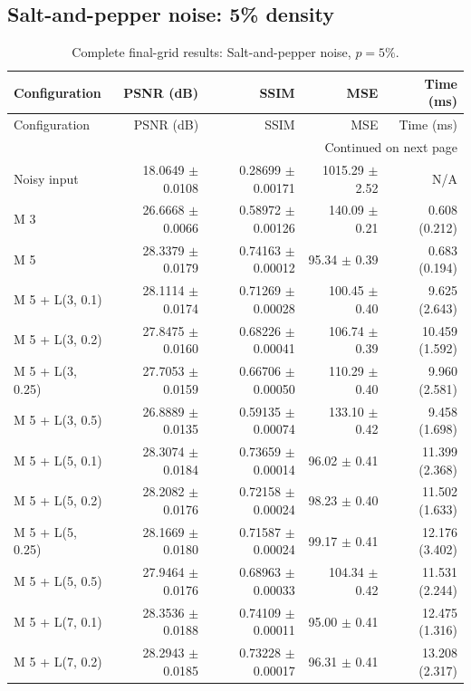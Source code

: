 \subsection{Salt-and-pepper noise: 5\% density}
\begingroup
\footnotesize
\setlength{\tabcolsep}{4pt}
\begin{longtable}{lrrrr}
\caption{Complete final-grid results: Salt-and-pepper noise, $p=5\%$.}\\
\toprule Configuration & PSNR (dB) & SSIM & MSE & Time (ms) \\ \midrule
\endfirsthead
\toprule Configuration & PSNR (dB) & SSIM & MSE & Time (ms) \\ \midrule
\endhead
\midrule \multicolumn{5}{r}{Continued on next page}\\
\endfoot
\bottomrule
\endlastfoot
Noisy input & 18.0649 $\pm$ 0.0108 & 0.28699 $\pm$ 0.00171 & 1015.29 $\pm$ 2.52 & N/A \\
M 3 & 26.6668 $\pm$ 0.0066 & 0.58972 $\pm$ 0.00126 & 140.09 $\pm$ 0.21 & 0.608 (0.212) \\
M 5 & 28.3379 $\pm$ 0.0179 & 0.74163 $\pm$ 0.00012 & 95.34 $\pm$ 0.39 & 0.683 (0.194) \\
M 5 + L(3, 0.1) & 28.1114 $\pm$ 0.0174 & 0.71269 $\pm$ 0.00028 & 100.45 $\pm$ 0.40 & 9.625 (2.643) \\
M 5 + L(3, 0.2) & 27.8475 $\pm$ 0.0160 & 0.68226 $\pm$ 0.00041 & 106.74 $\pm$ 0.39 & 10.459 (1.592) \\
M 5 + L(3, 0.25) & 27.7053 $\pm$ 0.0159 & 0.66706 $\pm$ 0.00050 & 110.29 $\pm$ 0.40 & 9.960 (2.581) \\
M 5 + L(3, 0.5) & 26.8889 $\pm$ 0.0135 & 0.59135 $\pm$ 0.00074 & 133.10 $\pm$ 0.42 & 9.458 (1.698) \\
M 5 + L(5, 0.1) & 28.3074 $\pm$ 0.0184 & 0.73659 $\pm$ 0.00014 & 96.02 $\pm$ 0.41 & 11.399 (2.368) \\
M 5 + L(5, 0.2) & 28.2082 $\pm$ 0.0176 & 0.72158 $\pm$ 0.00024 & 98.23 $\pm$ 0.40 & 11.502 (1.633) \\
M 5 + L(5, 0.25) & 28.1669 $\pm$ 0.0180 & 0.71587 $\pm$ 0.00024 & 99.17 $\pm$ 0.41 & 12.176 (3.402) \\
M 5 + L(5, 0.5) & 27.9464 $\pm$ 0.0176 & 0.68963 $\pm$ 0.00033 & 104.34 $\pm$ 0.42 & 11.531 (2.244) \\
M 5 + L(7, 0.1) & 28.3536 $\pm$ 0.0188 & 0.74109 $\pm$ 0.00011 & 95.00 $\pm$ 0.41 & 12.475 (1.316) \\
M 5 + L(7, 0.2) & 28.2943 $\pm$ 0.0185 & 0.73228 $\pm$ 0.00017 & 96.31 $\pm$ 0.41 & 13.208 (2.317) \\

\end{longtable}
